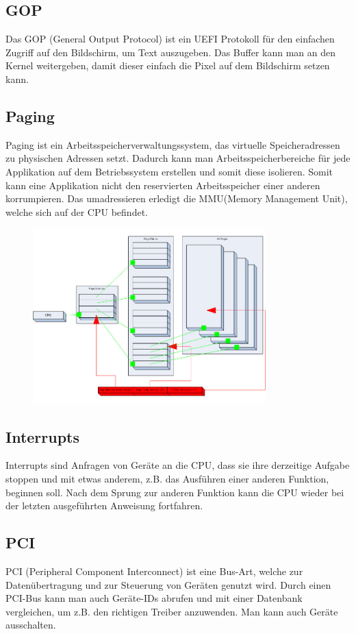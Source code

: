 \documentclass[12pt]{article}
\begin{document}
	\subsection{GOP}
	Das GOP\cite{gop} (General Output Protocol) ist ein UEFI\cite{uefi} Protokoll für den einfachen Zugriff auf den Bildschirm, um Text auszugeben. Das Buffer kann man an den Kernel\cite{kernel} weitergeben, damit dieser einfach die Pixel auf dem Bildschirm setzen kann. 
	\subsection{Paging}
	Paging\cite{paging} ist ein Arbeitsspeicherverwaltungssystem, das virtuelle Speicheradressen zu physischen Adressen setzt. Dadurch kann man Arbeitsspeicherbereiche für jede Applikation auf dem Betriebssystem erstellen und somit diese isolieren. Somit kann eine Applikation nicht den reservierten Arbeitsspeicher einer anderen korrumpieren. Das umadressieren erledigt die MMU(Memory Management Unit), welche sich auf der CPU befindet.
	\begin{figure}[h]
		\centering
		\includegraphics[width=9cm]{paging}
	\end{figure}
	\newpage
	\subsection{Interrupts}
	Interrupts\cite{interrupts} sind Anfragen von Geräte an die CPU, dass sie ihre derzeitige Aufgabe stoppen und mit etwas anderem, z.B. das Ausführen einer anderen Funktion, beginnen soll. Nach dem Sprung zur anderen Funktion kann die CPU wieder bei der letzten ausgeführten Anweisung fortfahren.
	\subsection{PCI}
	PCI\cite{pci} (Peripheral Component Interconnect) ist eine Bus-Art, welche zur Datenübertragung und zur Steuerung von Geräten genutzt wird. Durch einen PCI\cite{pci}-Bus kann man auch Geräte-IDs abrufen und mit einer Datenbank vergleichen, um z.B. den richtigen Treiber anzuwenden. Man kann auch Geräte ausschalten.
\end{document}
